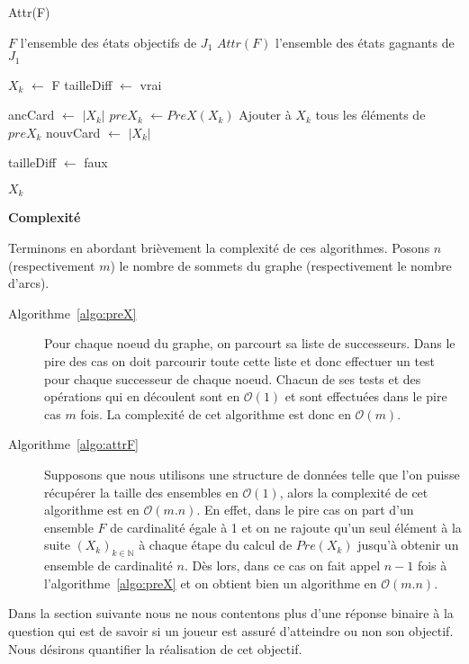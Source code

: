 \begin{algorithm}
	\caption{Attr(F)}
	\label{algo:attrF}
	\begin{algorithmic}[1]
		\REQUIRE $F$ l'ensemble des états objectifs de $J_{1}$
		\ENSURE $Attr(F)$ l'ensemble des états gagnants de $J_{1}$
		
		\STATE $X_{k}$ $\leftarrow$ F
		\STATE tailleDiff $\leftarrow$ vrai
		
			\STATE ancCard $\leftarrow$ $|X_{k}|$
			\STATE $preX_{k}$ $\leftarrow PreX(X_{k})$
			\STATE Ajouter à $X_{k}$ tous les éléments de $preX_{k}$
			\STATE nouvCard $\leftarrow$ $|X_{k}|$
			
				\STATE tailleDiff $\leftarrow$ faux
			\ENDIF
		\ENDWHILE
		
		\RETURN $X_{k}$
\end{algorithmic}
\end{algorithm}
$ $\\

\noindent\textbf{Complexité}

Terminons en abordant brièvement la complexité de ces algorithmes. Posons $n$ (respectivement $m$) le nombre de sommets du graphe (respectivement le nombre d'arcs).
\begin{description}
	\item[Algorithme~\ref{algo:preX}] Pour chaque noeud du graphe, on parcourt sa liste de successeurs. Dans le pire des cas on doit parcourir toute cette liste et donc effectuer un test pour chaque successeur de chaque noeud. Chacun de ses tests et des opérations qui en découlent sont en $\mathcal{O}(1)$ et sont effectuées dans le pire cas $m$ fois. La complexité de cet algorithme est donc en $\mathcal{O}(m)$.
	
	\item[Algorithme~\ref{algo:attrF}] Supposons que nous utilisons une structure de données telle que l'on puisse récupérer la taille des ensembles en $\mathcal{O}(1)$, alors la complexité de cet algorithme est en $\mathcal{O}(m.n)$. En effet, dans le pire cas on part d'un ensemble $F$ de cardinalité égale à 1 et on ne rajoute qu'un seul élément à la suite $(X_k)_{k \in \mathbb{N}}$ à chaque étape du calcul de $Pre(X_k)$ jusqu'à obtenir un ensemble de cardinalité $n$. Dès lors, dans ce cas on fait appel $n-1$ fois à l'algorithme~\ref{algo:preX} et on obtient bien un algorithme en $\mathcal{O}(m.n)$.

	
\end{description}

Dans la section suivante nous ne nous contentons plus d'une réponse binaire à la question qui est de savoir si un joueur est assuré d'atteindre ou non son objectif. Nous désirons quantifier la réalisation de cet objectif. 

\FloatBarrier


